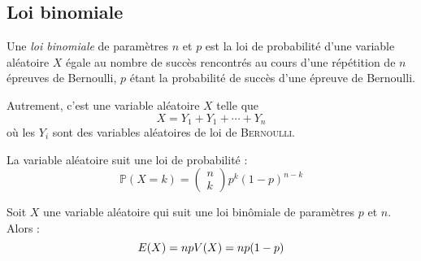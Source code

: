 \documentclass[11pt,a4paper,fleqn,pdftex]{report}
\begin{document}
\subsection{Loi binomiale} %
\label{sub:loi_binomiale}
\begin{dfn}
     Une \emph{loi binomiale} de paramètres $n$ et $p$ est la loi de probabilité d'une variable aléatoire $X$ égale au nombre de succès rencontrés au cours d'une répétition de $n$ épreuves de Bernoulli, $p$ étant la probabilité de succès d'une épreuve de Bernoulli.\par
     Autrement, c'est une variable aléatoire $X$ telle que 
     \[
         X = Y_1 + Y_1 + \cdots + Y_n
     \]
     où les $Y_i$ sont des variables aléatoires  de loi de \textsc{Bernoulli}.\par
     La variable aléatoire suit une loi de probabilité : 
     \begin{equation}
     \mathbb{P}(X = k) = \begin{pmatrix} n \\ k \end{pmatrix} p^k(1-p)^{n-k}
     \end{equation}
\end{dfn}
\begin{theorem}
     Soit $X$ une variable aléatoire qui suit une loi binômiale de paramètres $p$ et $n$. Alors :
     \begin{equation}
     E(X) = np \\ V(X) = np(1-p)
     \end{equation}
\end{theorem}
\end{document}
